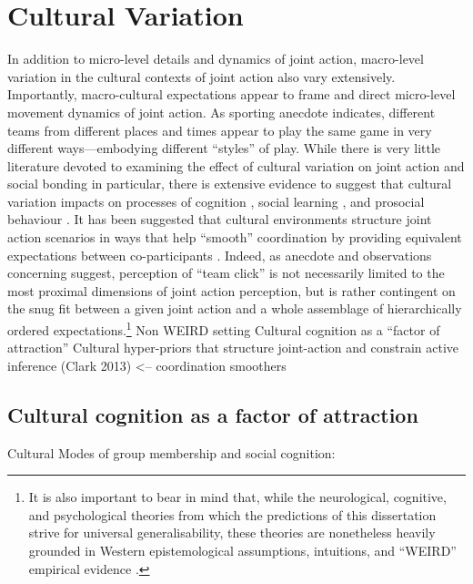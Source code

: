 {  \section{Cultural Variation}
  In addition to micro-level details and dynamics of joint action, macro-level variation in the cultural contexts of joint action also vary extensively. Importantly, macro-cultural expectations appear to frame and direct micro-level movement dynamics of joint action.  As sporting anecdote indicates, different teams from different places and times appear to play the same game in very different ways---embodying different ``styles'' of play.  While there is very little literature devoted to examining the effect of cultural variation on joint action and social bonding in particular, there is extensive evidence to suggest that cultural variation impacts on processes of cognition \citep{Nisbett2003,Hoshino-Browne2005}, social learning \citep{Mesoudi2015}, and prosocial behaviour \citep{Yuki2005,Yuki2003}.
  It has been suggested that cultural environments structure joint action scenarios in ways that help ``smooth'' coordination by providing equivalent expectations between co-participants \citep{Vesper2017}.  Indeed, as anecdote and observations concerning suggest, perception of ``team click'' is not necessarily limited to the most proximal dimensions of joint action perception, but is rather contingent on the snug fit between a given joint action and a whole assemblage of hierarchically ordered expectations.\footnote{It is also important to bear in mind that, while the neurological, cognitive, and psychological theories from which the predictions of this dissertation strive for universal generalisability, these theories are nonetheless heavily grounded in Western epistemological assumptions, intuitions, and ``WEIRD'' empirical evidence \citep{Henrich2010a}.}
    Non WEIRD setting
    Cultural cognition as a ``factor of attraction''
    Cultural hyper-priors that structure joint-action and constrain active inference (Clark 2013) <-- coordination smoothers

  \subsection{Cultural cognition as a factor of attraction}

  Cultural Modes of group membership and social cognition:

}
